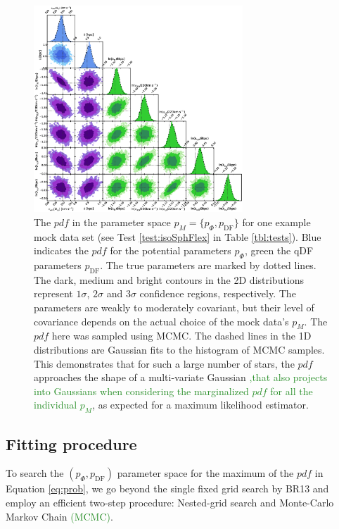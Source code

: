 \documentclass[iop,revtex4]{emulateapj}
\newcommand{\pdf}{\ensuremath{pdf}}
\newcommand{\pmodel}{\ensuremath{p_M}}
\newcommand{\NEW}[1]{\textcolor{ForestGreen}{#1}}
\newcommand{\OLD}[1]{}
\begin{document}
\begin{figure}[!htbp]
\centering
\includegraphics[width=0.7\textwidth]{figs/isoSphFlex_short_hot_2kpc_triangle_MCMC.eps}
\caption{The \pdf{} in the parameter space $\pmodel{} = \{p_\Phi,p_\text{DF}\}$ for one example mock data set (see Test \ref{test:isoSphFlex} in Table \ref{tbl:tests}). Blue indicates the \pdf{} for the potential parameters $p_\Phi$, green the qDF parameters $p_\text{DF}$. The true parameters are marked by dotted lines. The dark, medium and bright contours in the 2D distributions represent $1\sigma$, $2\sigma$ and $3\sigma$ confidence regions, respectively. The parameters are weakly to moderately covariant, but their level of covariance depends on the actual choice of the mock data's \pmodel{}. The \pdf{} here was sampled using MCMC. The dashed lines in the 1D distributions are Gaussian fits to the histogram of MCMC samples. This demonstrates \OLD{very well} that for such a large number of stars, the \pdf{} approaches the shape of a multi-variate Gaussian \NEW{,that also projects into Gaussians when considering the marginalized \pdf{} for all the individual \pmodel{}}, as expected for a maximum likelihood estimator.}
\label{fig:isoSphFlex_triangleplot}
\end{figure}

\subsection{Fitting procedure} \label{sec:fitting}

To search the $(p_\Phi,p_\text{DF})$ parameter space for the maximum of the \pdf{} in Equation \eqref{eq:prob}, we go beyond the single fixed grid search by BR13 and employ an efficient two-step procedure: Nested-grid search and Monte-Carlo Markov Chain \NEW{(MCMC)}.
\end{document}
